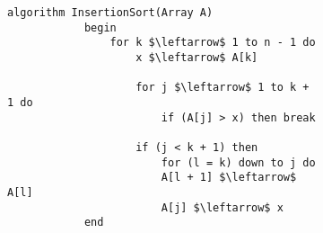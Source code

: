 \documentclass{subfiles}
\begin{document}
\begin{figure}[!h]
    \centering
    \begin{subfigure}[b]{0.5\textwidth}
        \begin{lstlisting}[language = algol]
            algorithm InsertionSort(Array A)
            begin
                for k $\leftarrow$ 1 to n - 1 do 
                    x $\leftarrow$ A[k]

                    for j $\leftarrow$ 1 to k + 1 do
                        if (A[j] > x) then break

                    if (j < k + 1) then
                        for (l = k) down to j do 
                        A[l + 1] $\leftarrow$ A[l]
                        A[j] $\leftarrow$ x
            end
        \end{lstlisting}
    \end{subfigure}
    \label{Fig:}
\end{figure}
\end{document}
